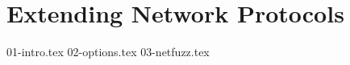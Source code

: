 \chapter{Extending Network Protocols}
\label{extend:chapter}

{01-intro.tex}
{02-options.tex}
{03-netfuzz.tex}



